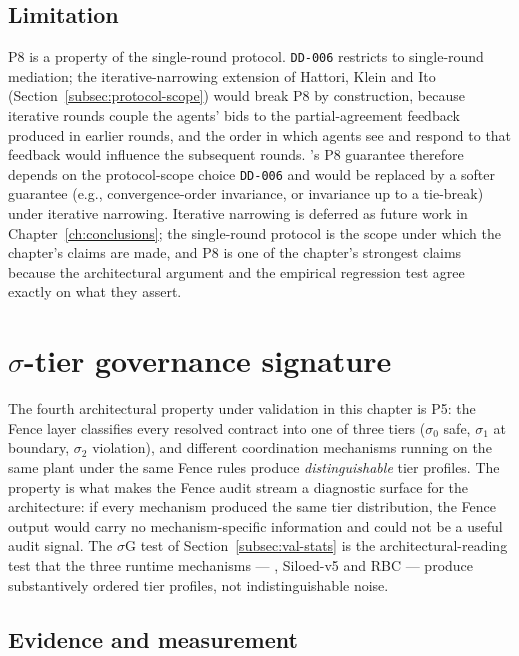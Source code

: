\subsection*{Limitation}

P8 is a property of the single-round protocol. \texttt{DD-006}
restricts \NEXUS{} to single-round mediation; the iterative-narrowing
extension of Hattori, Klein and Ito (Section~\ref{subsec:protocol-scope})
would break P8 by construction, because iterative rounds couple the
agents' bids to the partial-agreement feedback produced in earlier
rounds, and the order in which agents see and respond to that
feedback would influence the subsequent rounds. \NEXUS{}'s P8
guarantee therefore depends on the protocol-scope choice
\texttt{DD-006} and would be replaced by a softer guarantee (e.g.,
convergence-order invariance, or invariance up to a tie-break) under
iterative narrowing. Iterative narrowing is deferred as future work
in Chapter~\ref{ch:conclusions}; the single-round protocol is the
scope under which the chapter's claims are made, and P8 is one of
the chapter's strongest claims because the architectural argument and
the empirical regression test agree exactly on what they assert.

\section{$\sigma$-tier governance signature}
\label{sec:val-sigma}

The fourth architectural property under validation in this chapter is
P5: the Fence layer classifies every resolved contract into one of
three tiers ($\sigma_0$ safe, $\sigma_1$ at boundary, $\sigma_2$
violation), and different coordination mechanisms running on the same
plant under the same Fence rules produce \emph{distinguishable} tier
profiles. The property is what makes the Fence audit stream a
diagnostic surface for the architecture: if every mechanism produced
the same tier distribution, the Fence output would carry no
mechanism-specific information and could not be a useful audit signal.
The $\sigma$G test of Section~\ref{subsec:val-stats} is the
architectural-reading test that the three runtime mechanisms ---
\NEXUS{}, Siloed-v5 and RBC --- produce substantively ordered tier
profiles, not indistinguishable noise.

\subsection*{Evidence and measurement}

